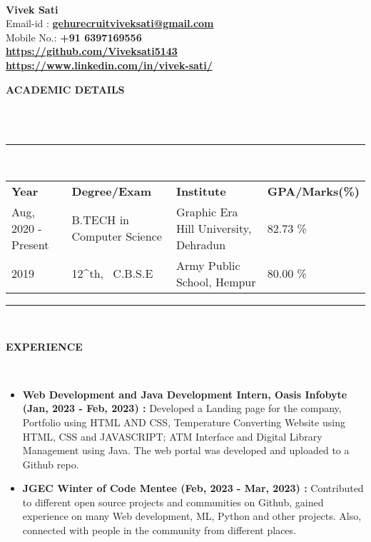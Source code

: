 \documentclass[a4paper,10pt]{article}
\newcommand{\lsep}{-0.5cm}
\newcommand{\resheading}[1]{{\small \colorbox{mygrey}{\begin{minipage}{0.975\textwidth}{\textbf{#1 \vphantom{p\^{E}}}}\end{minipage}}}}
\begin{document}
\hspace{0.5cm}\\[-0.2cm]

\textbf{Vivek Sati} \\
\indent Email-id : \textbf{\url{gehurecruitviveksati@gmail.com}} \\
\indent Mobile No.: \textbf{+91 6397169556} \ \\
\indent \textbf{\url{https://github.com/Viveksati5143}}\\
\indent \textbf{\url{https://www.linkedin.com/in/vivek-sati/}}\\

\resheading{\textbf{ACADEMIC DETAILS} }\\[\lsep]
\\
\indent \rule{6.8in}{0.4pt}\\
\indent \begin{tabular}{ l @{\hskip 0.15in} l @{\hskip 0.15in} l @{\hskip 0.15in} l @{\hskip 0.15in} }
\noindent \textbf{Year} & \textbf{Degree/Exam} & \textbf{Institute} & \textbf{GPA/Marks(\%)} \\
Aug, 2020 - Present & B.TECH in Computer Science & Graphic Era Hill University, Dehradun & 82.73 \% \\
2019 & 12^{th}, \ C.B.S.E & Army Public School, Hempur & 80.00 \% \\

\end{tabular}
\indent \rule{6.8in}{0.4pt}
\\

\resheading{\textbf{EXPERIENCE} }\\[\lsep]
\begin{itemize}
\setlength\itemsep{0.5em}
\item \textbf{Web Development and Java Development Intern, Oasis Infobyte (Jan, 2023 - Feb, 2023) : }Developed
a Landing page for the company, Portfolio using HTML AND CSS, Temperature Converting Website using HTML, CSS and JAVASCRIPT; ATM Interface and Digital Library Management using Java.
The web portal was developed and uploaded to a Github repo.
\item \textbf{JGEC Winter of Code Mentee (Feb, 2023 - Mar, 2023) : }Contributed to different open source projects and communities on Github, gained experience on many Web development, ML, Python and other projects. Also, connected with people in the community from different places.
\end{itemize}
\end{document}
